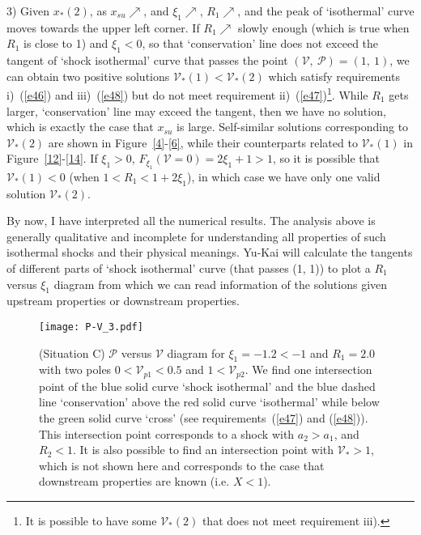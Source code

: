 \documentclass[fleqn,usenatbib]{mnras}
\begin{document}
3) Given $x_{*}(2)$, as $x_{su}\nearrow$, and $\xi_{1}\nearrow$, $R_{1}\nearrow$, and the peak of `isothermal' curve moves towards the upper left corner. If $R_{1}\nearrow$ slowly enough (which is true when $R_{1}$ is close to 1) and $\xi_{1}<0$, so that `conservation' line does not exceed the tangent of `shock isothermal' curve that passes the point $(\mathcal{V},\ \mathcal{P})=(1,\ 1)$, we can obtain two positive solutions $\mathcal{V}_{*}(1)<\mathcal{V}_{*}(2)$ which satisfy requirements i)~(\ref{e46}) and iii)~(\ref{e48}) but do not meet requirement ii)~(\ref{e47})\footnote{It is possible to have some $\mathcal{V}_{*}(2)$ that does not meet requirement iii).}. While $R_{1}$ gets larger, `conservation' line may exceed the tangent, then we have no solution, which is exactly the case that $x_{su}$ is large. Self-similar solutions corresponding to $\mathcal{V}_{*}(2)$ are shown in Figure~\ref{4}-\ref{6}, while their counterparts related to $\mathcal{V}_{*}(1)$ in Figure~\ref{12}-\ref{14}. If $\xi_{1}>0$, $F_{\xi_{1}}(\mathcal{V}=0)=2\xi_{1}+1>1$, so it is possible that $\mathcal{V}_{*}(1)<0$ (when $1<R_{1}<1+2\xi_{1}$), in which case we have only one valid solution $\mathcal{V}_{*}(2)$. 

By now, I have interpreted all the numerical results. The analysis above is generally qualitative and incomplete for understanding all properties of such isothermal shocks and their physical meanings. Yu-Kai will calculate the tangents of different parts of `shock isothermal' curve (that passes (1, 1)) to plot a $R_{1}$ versus $\xi_{1}$ diagram from which we can read information of the solutions given upstream properties or downstream properties. 

\begin{figure}
\centering
\texttt{[image: P-V\_3.pdf]}
\caption{(Situation C) $\mathcal{P}$ versus $\mathcal{V}$ diagram for $\xi_{1}=-1.2<-1$ and $R_{1}=2.0$ with two poles $0<\mathcal{V}_{p1}<0.5$ and $1<\mathcal{V}_{p2}$. We find one intersection point of the blue solid curve `shock isothermal' and the blue dashed line `conservation' above the red solid curve `isothermal' while below the green solid curve `cross' (see requirements~(\ref{e47}) and (\ref{e48})). This intersection point corresponds to a shock with $a_{2}>a_{1}$, and $R_{2}<1$. It is also possible to find an intersection point with $\mathcal{V}_{*}>1$, which is not shown here and corresponds to the case that downstream properties are known (i.e. $X<1$).}
\label{7}
\end{figure}
\end{document}
